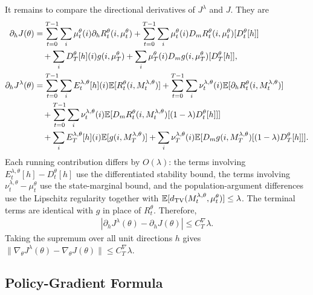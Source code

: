 It remains to compare the directional derivatives of $J^\lambda$ and $J$. They are
\begin{align}
    \partial_hJ(\theta)
    &=
    \sum_{t=0}^{T-1}\sum_i\mu_t^\theta(i)\partial_hR_t^\theta(i,\mu_t^\theta)
    +
    \sum_{t=0}^{T-1}\sum_i\mu_t^\theta(i)D_mR_t^\theta(i,\mu_t^\theta)[D_t^\theta[h]]\\
    &\quad+
    \sum_iD_T^\theta[h](i)g(i,\mu_T^\theta)
    +
    \sum_i\mu_T^\theta(i)D_mg(i,\mu_T^\theta)[D_T^\theta[h]],\\
    \partial_hJ^\lambda(\theta)
    &=
    \sum_{t=0}^{T-1}\sum_iE_t^{\lambda,\theta}[h](i)\mathbb{E}[R_t^\theta(i,M_t^{\lambda,\theta})]
    +
    \sum_{t=0}^{T-1}\sum_i\nu_t^{\lambda,\theta}(i)\mathbb{E}[\partial_hR_t^\theta(i,M_t^{\lambda,\theta})]\\
    &\quad+
    \sum_{t=0}^{T-1}\sum_i\nu_t^{\lambda,\theta}(i)
    \mathbb{E}[D_mR_t^\theta(i,M_t^{\lambda,\theta})[(1-\lambda)D_t^\theta[h]]]\\
    &\quad+
    \sum_iE_T^{\lambda,\theta}[h](i)\mathbb{E}[g(i,M_T^{\lambda,\theta})]
    +
    \sum_i\nu_T^{\lambda,\theta}(i)
    \mathbb{E}[D_mg(i,M_T^{\lambda,\theta})[(1-\lambda)D_T^\theta[h]]].
\end{align}
Each running contribution differs by $O(\lambda)$: the terms involving $E_t^{\lambda,\theta}[h]-D_t^\theta[h]$ use the differentiated stability bound, the terms involving $\nu_t^{\lambda,\theta}-\mu_t^\theta$ use the state-marginal bound, and the population-argument differences use the Lipschitz regularity together with $\mathbb{E}[d_\mathrm{TV}(M_t^{\lambda,\theta},\mu_t^\theta)]\leq\lambda$. The terminal terms are identical with $g$ in place of $R_t^\theta$. Therefore,
\begin{align}
    |\partial_hJ^\lambda(\theta)-\partial_hJ(\theta)|
    \leq
    C_T^\nabla\lambda.
\end{align}
Taking the supremum over all unit directions $h$ gives $\|\nabla_\theta J^\lambda(\theta)-\nabla_\theta J(\theta)\|\leq C_T^\nabla\lambda$.



\subsection{Policy-Gradient Formula}
\label{appendix:discrete-policy-gradient-proof}

